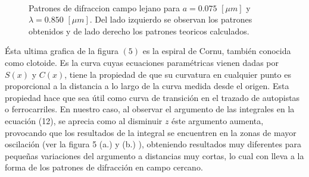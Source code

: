 \documentclass[11pt,letterpaper,twocolumn]{article}
\begin{document}
\begin{figure}[h!]
\begin{center}
\\
\caption{Patrones de difraccion campo lejano para $a=0.075$ $[\mu m]$ y $\lambda=0.850$ $[\mu m]$. Del lado izquierdo se observan los patrones obtenidos y de lado derecho los patrones teoricos calculados.}
\end{center}
\label{pos}
\end{figure}
\par 
Ésta ultima grafica de la figura $(5)$ es la espiral de Cornu, también conocida como clotoide. Es la curva cuyas ecuaciones paramétricas vienen dadas por $S(x)$ y $C(x)$, tiene la propiedad de que su curvatura en cualquier punto es proporcional a la distancia a lo largo de la curva medida desde el origen. Esta propiedad hace que sea útil como curva de transición en el trazado de autopistas o ferrocarriles. En nuestro caso, al observar el argumento de las integrales en la ecuación (12), se aprecia como al disminuir $z$ éste argumento aumenta, provocando que los resultados de la integral se encuentren en la zonas de mayor oscilación (ver la figura 5 (a.) y (b.) ), obteniendo resultados muy diferentes para pequeñas variaciones del argumento a distancias muy cortas, lo cual con lleva a la forma de los patrones de difracción en campo cercano.\\
\par 
\end{document}
